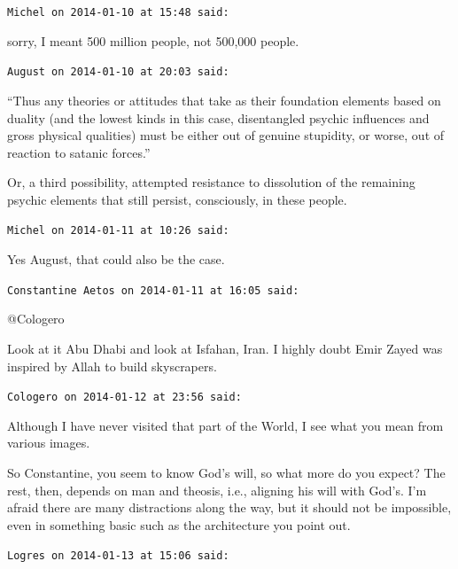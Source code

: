 \begin{footnotesize}
\begin{sffamily}
\hfill

\texttt{Michel on 2014-01-10 at 15:48 said:}

sorry, I meant 500 million people, not 500,000 people.

\hfill

\texttt{August on 2014-01-10 at 20:03 said:}

``Thus any theories or attitudes that take as their foundation elements based on duality (and the lowest kinds in this case, disentangled psychic influences and gross physical qualities) must be either out of genuine stupidity, or worse, out of reaction to satanic forces.''

Or, a third possibility, attempted resistance to dissolution of the remaining psychic elements that still persist, consciously, in these people.

\hfill

\texttt{Michel on 2014-01-11 at 10:26 said:}

Yes August, that could also be the case.

\hfill

\texttt{Constantine Aetos on 2014-01-11 at 16:05 said:}

@Cologero

Look at it Abu Dhabi and look at Isfahan, Iran. I highly doubt Emir Zayed was inspired by Allah to build skyscrapers.

\hfill

\texttt{Cologero on 2014-01-12 at 23:56 said:}

Although I have never visited that part of the World, I see what you mean from various images.

So Constantine, you seem to know God's will, so what more do you expect? The rest, then, depends on man and theosis, i.e., aligning his will with God's. I'm afraid there are many distractions along the way, but it should not be impossible, even in something basic such as the architecture you point out.

\hfill

\texttt{Logres on 2014-01-13 at 15:06 said:}


\end{sffamily}
\end{footnotesize}
